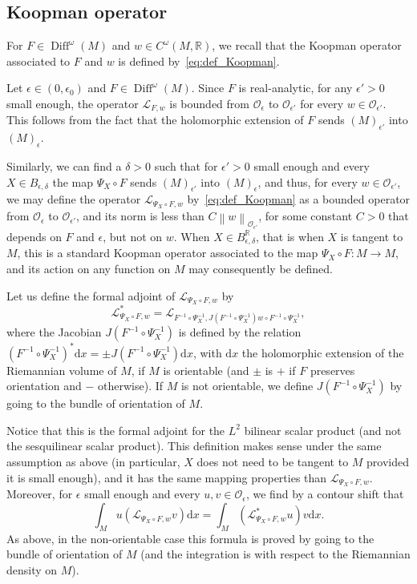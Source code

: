 \documentclass[AHL,Unicode,longabstracts,published]{cedram}
\DeclareMathOperator{\Diff}{Diff}
\newcommand{\n}[1]{\left\|#1\right\|}
\newcommand{\clO}{\mathcal{O}}
\newcommand{\clL}{\mathcal{L}}
\newcommand{\bbR}{\mathbb{R}}
\newcommand{\rmd}{\mathrm{d}}
\newcommand{\clO}{\mathcal{O}}
\begin{document}
\subsection{Koopman operator}\label{subsection:koopman}

For $F \in \Diff^\omega(M)$ and $w \in C^\omega(M,\bbR)$, we recall that the Koopman operator associated to $F$ and $w$ is defined by~\eqref{eq:def_Koopman}.

Let $\epsilon \in (0,\epsilon_0)$ and $F \in \Diff^\omega(M)$. Since $F$ is real-analytic, for any $\epsilon'> 0$ small enough, the operator $\clL_{F,w}$ is bounded from $\clO_\epsilon$ to $\clO_{\epsilon'}$ for every $w \in \clO_{\epsilon'}$. This follows from the fact that the holomorphic extension of $F$ sends $(M)_{\epsilon'}$ into $(M)_\epsilon$.

Similarly, we can find a $\delta > 0$ such that for $\epsilon' > 0$ small enough and every $X \in B_{\epsilon,\delta}$ the map $\Psi_X \circ F$ sends $(M)_{\epsilon'}$ into $(M)_\epsilon$, and thus, for every $w \in \clO_{\epsilon'}$, we may define the operator $\clL_{\Psi_X \circ F,w}$ by~\eqref{eq:def_Koopman} as a bounded operator from $\clO_\epsilon$ to $\clO_{\epsilon'}$, and its norm is less than $C \n{w}_{\clO_{\epsilon'}}$, for some constant $C> 0$ that depends on $F$ and $\epsilon$, but not on $w$. When $X \in B_{\epsilon,\delta}^{\bbR}$, that is when $X$ is tangent to $M$, this is a standard Koopman operator associated to the map $\Psi_X \circ F : M \to M$, and its action on any function on $M$ may consequently be defined.

Let us define the formal adjoint of $\clL_{\Psi_X \circ F,w}$ by
\begin{equation*}
\clL_{\Psi_X \circ F,w}^* = \clL_{F^{-1} \circ \Psi_X^{-1}, J \left(F^{-1} \circ \Psi_X^{-1}\right) w \circ F^{-1} \circ \Psi_{X}^{-1}},
\end{equation*}
where the Jacobian $J(F^{-1} \circ \Psi_X^{-1})$ is defined by the relation $(F^{-1} \circ \Psi_X^{-1})^* \rmd x = \pm J(F^{-1} \circ \Psi_X^{-1}) \rmd x$, with $\rmd x$ the holomorphic extension of the Riemannian volume of $M$, if $M$ is orientable (and $\pm$ is $+$ if $F$ preserves orientation and $-$ otherwise). If $M$ is not orientable, we define $J(F^{-1} \circ \Psi_X^{-1})$ by going to the bundle of orientation of $M$.

Notice that this is the formal adjoint for the $L^2$ bilinear scalar product (and not the sesquilinear scalar product). This definition makes sense under the same assumption as above (in particular, $X$ does not need to be tangent to $M$ provided it is small enough), and it has the same mapping properties than $\clL_{\Psi_X \circ F,w}$. Moreover, for $\epsilon$ small enough and every $u,v \in \clO_\epsilon$, we find by a contour shift that
\begin{equation*}
\int_M u \left(\clL_{\Psi_X \circ F,w} v\right) \rmd x = \int_M \left(\clL_{\Psi_X \circ F,w}^* u\right) v \rmd x.
\end{equation*}
As above, in the non-orientable case this formula is proved by going to the bundle of orientation of $M$ (and the integration is with respect to the Riemannian density on $M$).
\end{document}

